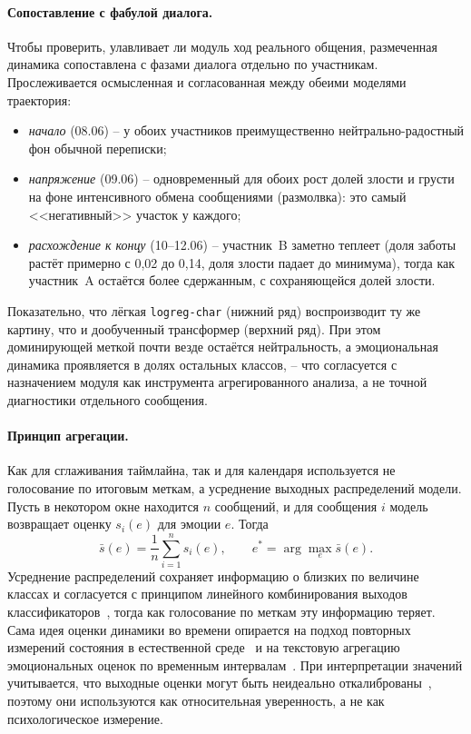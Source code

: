 \documentclass[12pt,a4paper]{report}
\begin{document}
\paragraph{Сопоставление с фабулой диалога.} Чтобы проверить, улавливает ли модуль ход реального общения, размеченная динамика сопоставлена с фазами диалога отдельно по участникам. Прослеживается осмысленная и согласованная между обеими моделями траектория:
\begin{itemize}
  \item \emph{начало} (08.06) -- у обоих участников преимущественно нейтрально-радостный фон обычной переписки;
  \item \emph{напряжение} (09.06) -- одновременный для обоих рост долей злости и грусти на фоне интенсивного обмена сообщениями (размолвка): это самый <<негативный>> участок у каждого;
  \item \emph{расхождение к концу} (10--12.06) -- участник~B заметно теплеет (доля заботы растёт примерно с 0{,}02 до 0{,}14, доля злости падает до минимума), тогда как участник~A остаётся более сдержанным, с сохраняющейся долей злости.
\end{itemize}
Показательно, что лёгкая \texttt{logreg-char} (нижний ряд) воспроизводит ту же картину, что и дообученный трансформер (верхний ряд). При этом доминирующей меткой почти везде остаётся нейтральность, а эмоциональная динамика проявляется в долях остальных классов, -- что согласуется с назначением модуля как инструмента агрегированного анализа, а не точной диагностики отдельного сообщения.

\paragraph{Принцип агрегации.} Как для сглаживания таймлайна, так и для календаря используется не голосование по итоговым меткам, а усреднение выходных распределений модели. Пусть в некотором окне находится \(n\) сообщений, и для сообщения \(i\) модель возвращает оценку \(s_i(e)\) для эмоции \(e\). Тогда
\[
  \bar s(e) = \frac{1}{n}\sum_{i=1}^{n} s_i(e), \qquad e^{*} = \arg\max_{e} \bar s(e).
\]
Усреднение распределений сохраняет информацию о близких по величине классах и согласуется с принципом линейного комбинирования выходов классификаторов~\cite{tumer1999combiners}, тогда как голосование по меткам эту информацию теряет. Сама идея оценки динамики во времени опирается на подход повторных измерений состояния в естественной среде~\cite{shiffman2008ema} и на текстовую агрегацию эмоциональных оценок по временным интервалам~\cite{dodds2011hedonometrics}. При интерпретации значений учитывается, что выходные оценки могут быть неидеально откалиброваны~\cite{guo2017calibration}, поэтому они используются как относительная уверенность, а не как психологическое измерение.
\end{document}
